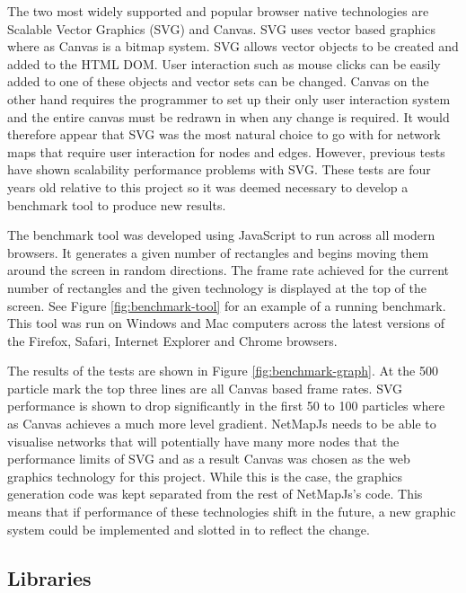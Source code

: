 \documentclass[11pt, a4paper]{article}
\begin{document}
The two most widely supported and popular browser native technologies are
Scalable Vector Graphics (SVG) and Canvas.\cite{Ferraiolo_2002}\cite{Canvas} SVG
uses vector based graphics where as Canvas is a bitmap system. SVG allows vector
objects to be created and added to the HTML DOM. User interaction such as mouse
clicks can be easily added to one of these objects and vector sets can be
changed. Canvas on the other hand requires the programmer to set up their only
user interaction system and the entire canvas must be redrawn in when any change
is required. It would therefore appear that SVG was the most natural choice to
go with for network maps that require user interaction for nodes and edges.
However, previous tests have shown scalability performance problems with
SVG.\cite{Johnson_2008} These tests are four years old relative to this project
so it was deemed necessary to develop a benchmark tool to produce new results.

The benchmark tool was developed using JavaScript to run across all modern
browsers. It generates a given number of rectangles and begins moving them
around the screen in random directions. The frame rate achieved for the current
number of rectangles and the given technology is displayed at the top of the
screen. See Figure \ref{fig:benchmark-tool} for an example of a running
benchmark. This tool was run on Windows and Mac computers across the latest
versions of the Firefox, Safari, Internet Explorer and Chrome browsers. 

The results of the tests are shown in Figure \ref{fig:benchmark-graph}. At the
500 particle mark the top three lines are all Canvas based frame rates. SVG
performance is shown to drop significantly in the first 50 to 100 particles
where as Canvas achieves a much more level gradient. NetMapJs needs to be able
to visualise networks that will potentially have many more nodes that the
performance limits of SVG and as a result Canvas was chosen as the web graphics
technology for this project. While this is the case, the graphics generation
code was kept separated from the rest of NetMapJs's code. This means that if
performance of these technologies shift in the future, a new graphic system
could be implemented and slotted in to reflect the change.

\subsection{Libraries}
\label{sec:libraries}
\end{document}
